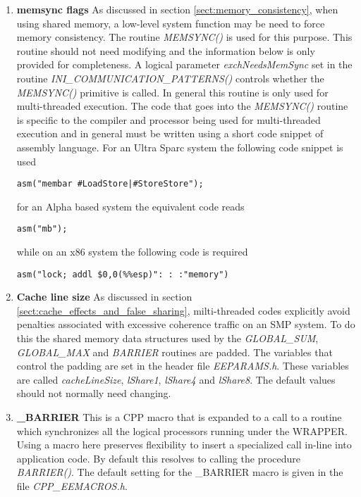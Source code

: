 \begin{enumerate}
\item {\bf memsync flags}
As discussed in section \ref{sect:memory_consistency}, when using shared memory,
a low-level system function may be need to force memory consistency.
The routine {\em MEMSYNC()} is used for this purpose. This routine should
not need modifying and the information below is only provided for
completeness. A logical parameter {\em exchNeedsMemSync} set
in the routine {\em INI\_COMMUNICATION\_PATTERNS()} controls whether
the {\em MEMSYNC()} primitive is called. In general this
routine is only used for multi-threaded execution.
The code that goes into the {\em MEMSYNC()}
 routine is specific to the compiler and
processor being used for multi-threaded execution and in general
must be written using a short code snippet of assembly language.
For an Ultra Sparc system the following code snippet is used
\begin{verbatim}
asm("membar #LoadStore|#StoreStore");
\end{verbatim}
for an Alpha based system the equivalent code reads
\begin{verbatim}
asm("mb");
\end{verbatim}
while on an x86 system the following code is required
\begin{verbatim}
asm("lock; addl $0,0(%%esp)": : :"memory")
\end{verbatim}

\item {\bf Cache line size}
As discussed in section \ref{sect:cache_effects_and_false_sharing},
milti-threaded codes explicitly avoid penalties associated with excessive 
coherence traffic on an SMP system. To do this the shared memory data structures
used by the {\em GLOBAL\_SUM}, {\em GLOBAL\_MAX} and {\em BARRIER} routines
are padded. The variables that control the padding are set in the
header file {\em EEPARAMS.h}. These variables are called
{\em cacheLineSize}, {\em lShare1}, {\em lShare4} and
{\em lShare8}. The default values should not normally need changing.
\item {\bf \_BARRIER}
This is a CPP macro that is expanded to a call to a routine
which synchronizes all the logical processors running under the
WRAPPER. Using a macro here preserves flexibility to insert
a specialized call in-line into application code. By default this
resolves to calling the procedure {\em BARRIER()}. The default
setting for the \_BARRIER macro is given in the file {\em CPP\_EEMACROS.h}.


\end{enumerate}
